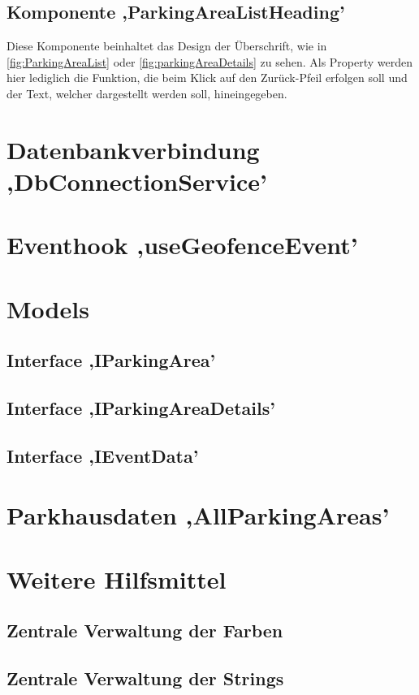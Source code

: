 \subsection{Komponente ,ParkingAreaListHeading'}
\label{parkingAreaListHeading}
Diese Komponente beinhaltet das Design der Überschrift, wie in \autoref{fig:ParkingAreaList} oder \autoref{fig:parkingAreaDetails} zu sehen. Als Property werden hier lediglich die Funktion, die beim Klick auf den Zurück-Pfeil erfolgen soll und der Text, welcher dargestellt werden soll, hineingegeben.

\section{Datenbankverbindung ,DbConnectionService'}
\section{Eventhook ,useGeofenceEvent'}
\label{geofenceEvent}
\section{Models}
\subsection{Interface ,IParkingArea'}
\subsection{Interface ,IParkingAreaDetails'}
\subsection{Interface ,IEventData'}
\section{Parkhausdaten ,AllParkingAreas'}
\label{AllParkingAreas}
\section{Weitere Hilfsmittel}
\subsection{Zentrale Verwaltung der Farben}
\subsection{Zentrale Verwaltung der Strings}